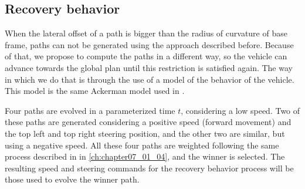 \subsection{Recovery behavior}\label{ch:chapter07_01_06}

When the lateral offset of a path is bigger than the radius of curvature of base frame, paths can not be generated using the approach described before. Because of that, we propose to compute the paths in a different way, so the vehicle can advance towards the global plan until this restriction is satisfied again. The way in which we do that is through the use of a model of the behavior of the vehicle. This model is the same Ackerman model used in \cite{espelosin2013path}.

Four paths are evolved in a parameterized time $t$, considering a low speed. Two of these paths are generated considering a positive speed (forward movement) and the top left and top right steering position, and the other two are similar, but using a negative speed. All these four paths are weighted following the same process described in in \ref{ch:chapter07_01_04}, and the winner is selected. The resulting speed and steering commands for the recovery behavior process will be those used to evolve the winner path.

